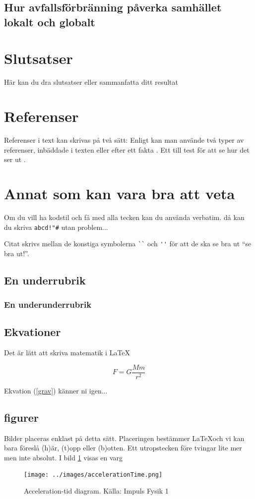 \documentclass[11p]{article}
\begin{document}
    \subsection{Hur avfallsförbränning påverka samhället lokalt och globalt}

    \section{Slutsatser}
    Här kan du dra slutsatser eller sammanfatta ditt resultat


    \section{Referenser}
    Referenser i text kan skrivas på två sätt: Enligt \textcite{Jens} kan man använde två typer av referenser, inbäddade i texten eller efter ett fakta \parencite{Fraenkel}. Ett till test för att se hur det ser ut \parencite[sid 55]{fermi}.

    \section{Annat som kan vara bra att veta}
    Om du vill ha kodstil och få med alla tecken kan du använda verbatim. då kan du skriva \verb|abcd!"#| utan problem...

    Citat skrivs mellan de konstiga symbolerna \verb|``| och \verb|''| för att de ska se bra ut ``se bra ut!''.
    \subsection{En underrubrik}
    \subsubsection{En underunderrubrik}
    \subsection{Ekvationer}
    Det är lätt att skriva matematik i \LaTeX

    \begin{equation}
        F = G \frac{M m}{r^2}
        \label{grav}
    \end{equation}

    Ekvation (\ref{grav}) känner ni igen...

    \subsection{figurer}
    Bilder placeras enklast på detta sätt. Placeringen bestämmer \LaTeX och vi kan bara föreslå (h)är, (t)opp eller (b)otten. Ett utropstecken före tvingar lite mer men inte absolut. I bild \ref{varg} visas en varg
    \begin{figure}[!h]
        \texttt{[image: ../images/accelerationTime.png]}
        \caption{Acceleration-tid diagram. Källa: Impuls Fysik 1}
        \label{varg}
    \end{figure}
    \printbibliography
\end{document}
